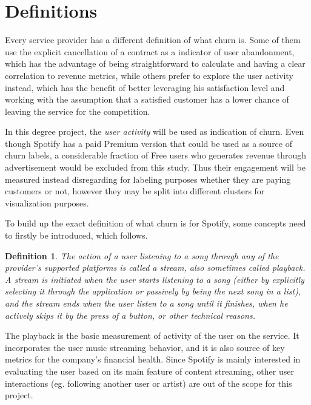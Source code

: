 \documentclass{kththesis}
\begin{document}
\section{Definitions}
\label{sec:definitions}

Every service provider has a different definition of what churn is. Some of them use the explicit cancellation of a contract as a indicator of user abandonment, which has  the advantage of being straightforward to calculate and having a clear correlation to revenue metrics, while others prefer to explore the user activity instead, which has the benefit of better leveraging his satisfaction level and working with the assumption that a satisfied customer has a lower chance of leaving the service for the competition. 

In this degree project, the \emph{user activity} will be used as indication of churn. Even though Spotify has a paid Premium version that could be used as a source of churn labels, a considerable fraction of Free users who generates revenue through advertisement would be excluded from this study. Thus their engagement will be measured instead disregarding for labeling purposes whether they are paying customers or not, however they may be split into different clusters for visualization purposes.

To build up the exact definition of what churn is for Spotify, some concepts need to firstly be introduced, which follows.

\newtheorem{definition}{Definition}

\begin{definition}
The action of a user listening to a song through any of the provider's supported platforms is called a \emph{stream}, also sometimes called \emph{playback}. A stream is initiated when the user starts listening to a song (either by explicitly selecting it through the application or passively by being the next song in a list), and the stream ends when the user listen to a song until it finishes, when he actively skips it by the press of a button, or other technical reasons.
\end{definition}

The playback is the basic measurement of activity of the user on the service. It incorporates the user music streaming behavior, and it is also source of key metrics for the company's financial health. Since Spotify is mainly interested in evaluating the user based on its main feature of content streaming, other user interactions (eg. following another user or artist) are out of the scope for this project. 
\end{document}
